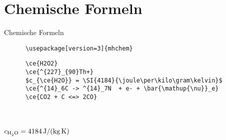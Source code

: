 \section{Chemische Formeln}
\begin{frame}[fragile]{Chemische Formeln}
  \begin{Packages}
    \begin{lstlisting}
      \usepackage[version=3]{mhchem}
    \end{lstlisting}
  \end{Packages}
  \begin{CodeExample}{0.51}
    \begin{lstlisting}
      \ce{H2O2}
      \ce{^{227}_{90}Th+}
      $c_{\ce{H2O}} = \SI{4184}{\joule\per\kilo\gram\kelvin}$
      \ce{^{14}_6C -> ^{14}_7N  + e- + \bar{\mathup{\nu}}_e}
      \ce{CO2 + C <=> 2CO}
    \end{lstlisting}
  \CodeResult
    \linespread{1.3}\selectfont
     \\
     \\
    $c_{\ce{H2O}} = \SI{4184}{\joule\per\kilo\gram\per\kelvin}$ \\[0.3\baselineskip]
     \\[0.3\baselineskip]
  \end{CodeExample}
\end{frame}
